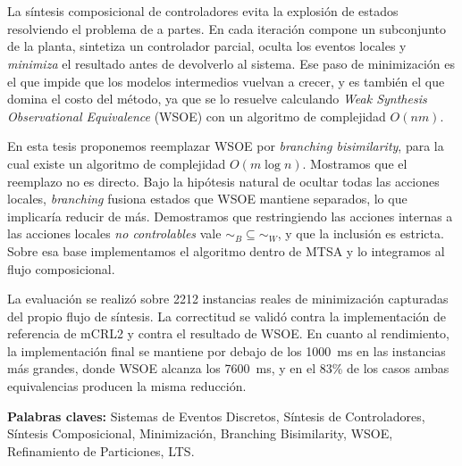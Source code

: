 \chapter*{\runtitulo}

\noindent La síntesis composicional de controladores evita la explosión de estados resolviendo el problema de a partes. En cada iteración compone un subconjunto de la planta, sintetiza un controlador parcial, oculta los eventos locales y \textit{minimiza} el resultado antes de devolverlo al sistema. Ese paso de minimización es el que impide que los modelos intermedios vuelvan a crecer, y es también el que domina el costo del método, ya que se lo resuelve calculando \textit{Weak Synthesis Observational Equivalence} (WSOE) con un algoritmo de complejidad $O(nm)$.

\noindent En esta tesis proponemos reemplazar WSOE por \textit{branching bisimilarity}, para la cual existe un algoritmo de complejidad $O(m \log n)$. Mostramos que el reemplazo no es directo. Bajo la hipótesis natural de ocultar todas las acciones locales, \textit{branching} fusiona estados que WSOE mantiene separados, lo que implicaría reducir de más. Demostramos que restringiendo las acciones internas a las acciones locales \textit{no controlables} vale $\sim_{B} \subseteq \sim_{W}$, y que la inclusión es estricta. Sobre esa base implementamos el algoritmo dentro de MTSA y lo integramos al flujo composicional.

\noindent La evaluación se realizó sobre 2212 instancias reales de minimización capturadas del propio flujo de síntesis. La correctitud se validó contra la implementación de referencia de mCRL2 y contra el resultado de WSOE. En cuanto al rendimiento, la implementación final se mantiene por debajo de los 1000~ms en las instancias más grandes, donde WSOE alcanza los 7600~ms, y en el 83\% de los casos ambas equivalencias producen la misma reducción.
\bigskip

\noindent\textbf{Palabras claves:} Sistemas de Eventos Discretos, Síntesis de Controladores, Síntesis Composicional, Minimización, Branching Bisimilarity, WSOE, Refinamiento de Particiones, LTS.
